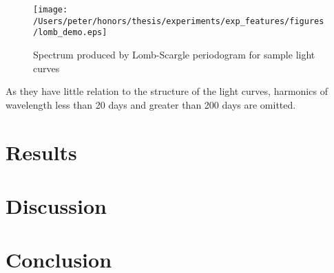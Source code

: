 	\begin{figure}[ht!]
		\label{fig:lsspectrum}
		\texttt{[image: /Users/peter/honors/thesis/experiments/exp\_features/figures/lomb\_demo.eps]}
		\caption{Spectrum produced by Lomb-Scargle periodogram for sample light curves}
	\end{figure}
	
	As they have little relation to the structure of the light curves, harmonics of wavelength less than 20 days and greater than 200 days are omitted.
	
	\section{Results}
	
	\section{Discussion}

	\section{Conclusion}
	
		

